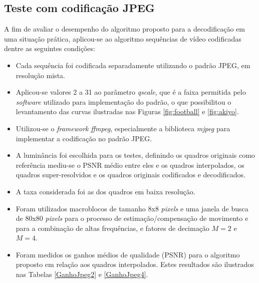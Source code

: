 \subsection{Teste com codificação JPEG}
A fim de avaliar o desempenho do algoritmo proposto para a decodificação em uma situação prática, aplicou-se ao algoritmo sequências de vídeo codificadas dentre as seguintes condições:
\begin{itemize}
\item Cada sequência foi codificada separadamente utilizando o padrão JPEG, em resolução mista.
\item Aplicou-se valores 2 a 31 ao parâmetro  \textit{qscale}, que é a faixa permitida pelo \textit{software} utilizado para implementação do padrão, o que possibilitou o levantamento das curvas ilustradas nas Figuras \ref{fig:football} e \ref{fig:akiyo}.
\item Utilizou-se o \textit{framework ffmpeg}, especialmente a biblioteca \textit{mjpeg}
para implementar a codificação no padrão JPEG.
\item A luminância foi escolhida para os testes, definindo os quadros originais como referência mediu-se o PSNR médio entre eles e os quadros interpolados, os quadros super-resolvidos e os quadros originais codificados e decodificados.
\item A taxa considerada foi as dos quadros em baixa resolução.
\item Foram utilizados macroblocos de tamanho 8x8 \textit{pixels} e uma janela de busca de 80x80 \textit{pixels} para o processo de estimação/compensação de movimento e para a combinação de altas frequências, e fatores de decimação $M=2$ e $M=4$.
\item Foram medidos os ganhos médios \cite{bjontegaard2001calcuation} de qualidade (PSNR) para o algoritmo proposto em relação aos quadros interpolados. Estes resultados são ilustrados nas Tabelas \ref{GanhoJpeg2} e \ref{GanhoJpeg4}.

\end{itemize}

